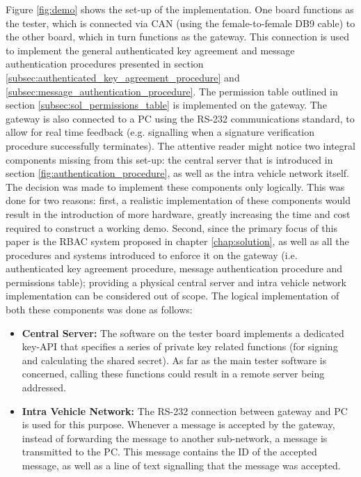 Figure \ref{fig:demo} shows the set-up of the implementation. One board functions as the tester, which is connected via CAN (using the female-to-female DB9 cable) to the other board, which in turn functions as the gateway. This connection is used to implement the general authenticated key agreement and message authentication procedures presented in section \ref{subsec:authenticated_key_agreement_procedure} and \ref{subsec:message_authentication_procedure}. The permission table outlined in section \ref{subsec:sol_permissions_table} is implemented on the gateway. The gateway is also connected to a PC using the RS-232 communications standard, to allow for real time feedback (e.g. signalling when a signature verification procedure successfully terminates). The attentive reader might notice two integral components missing from this set-up: the central server that is introduced in section \ref{fig:authentication_procedure}, as well as the intra vehicle network itself. The decision was made to implement these components only logically. This was done for two reasons: first, a realistic implementation of these components would result in the introduction of more hardware, greatly increasing the time and cost required to construct a working demo. Second, since the primary focus of this paper is the RBAC system proposed in chapter \ref{chap:solution}, as well as all the procedures and systems introduced to enforce it on the gateway (i.e. authenticated key agreement procedure, message authentication procedure and permissions table); providing a physical central server and intra vehicle network implementation can be considered out of scope. The logical implementation of both these components was done as follows:
\begin{itemize}
	\item \textbf{Central Server:} The software on the tester board implements a dedicated key-API that specifies a series of private key related functions (for signing and calculating the shared secret). As far as the main tester software is concerned, calling these functions could result in a remote server being addressed.
	
	\item \textbf{Intra Vehicle Network:} The RS-232 connection between gateway and PC is used for this purpose. Whenever a message is accepted by the gateway, instead of forwarding the message to another sub-network, a message is transmitted to the PC. This message contains the ID of the accepted message, as well as a line of text signalling that the message was accepted.
\end{itemize}

